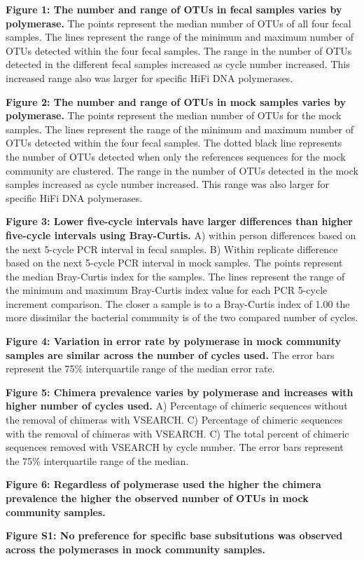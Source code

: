 \documentclass[11pt,]{article}
\begin{document}
\newpage

\textbf{Figure 1: The number and range of OTUs in fecal samples varies
by polymerase.} The points represent the median number of OTUs of all
four fecal samples. The lines represent the range of the minimum and
maximum number of OTUs detected within the four fecal samples. The range
in the number of OTUs detected in the different fecal samples increased
as cycle number increased. This increased range also was larger for
specific HiFi DNA polymerases.

\textbf{Figure 2: The number and range of OTUs in mock samples varies by
polymerase.} The points represent the median number of OTUs for the mock
samples. The lines represent the range of the minimum and maximum number
of OTUs detected within the four fecal samples. The dotted black line
represents the number of OTUs detected when only the references
sequences for the mock community are clustered. The range in the number
of OTUs detected in the mock samples increased as cycle number
increased. This range was also larger for specific HiFi DNA polymerases.

\textbf{Figure 3: Lower five-cycle intervals have larger differences
than higher five-cycle intervals using Bray-Curtis.} A) within person
differences based on the next 5-cycle PCR interval in fecal samples. B)
Within replicate difference based on the next 5-cycle PCR interval in
mock samples. The points represent the median Bray-Curtis index for the
samples. The lines represent the range of the minimum and maximum
Bray-Curtis index value for each PCR 5-cycle increment comparison. The
closer a sample is to a Bray-Curtis index of 1.00 the more dissimilar
the bacterial community is of the two compared number of cycles.

\textbf{Figure 4: Variation in error rate by polymerase in mock
community samples are similar across the number of cycles used.} The
error bars represent the 75\% interquartile range of the median error
rate.

\textbf{Figure 5: Chimera prevalence varies by polymerase and increases
with higher number of cycles used.} A) Percentage of chimeric sequences
without the removal of chimeras with VSEARCH. C) Percentage of chimeric
sequences with the removal of chimeras with VSEARCH. C) The total
percent of chimeric sequences removed with VSEARCH by cycle number. The
error bars represent the 75\% interquartile range of the median.

\textbf{Figure 6: Regardless of polymerase used the higher the chimera
prevalence the higher the observed number of OTUs in mock community
samples.}

\newpage

\textbf{Figure S1: No preference for specific base subsitutions was
observed across the polymerases in mock community samples.}
\end{document}
